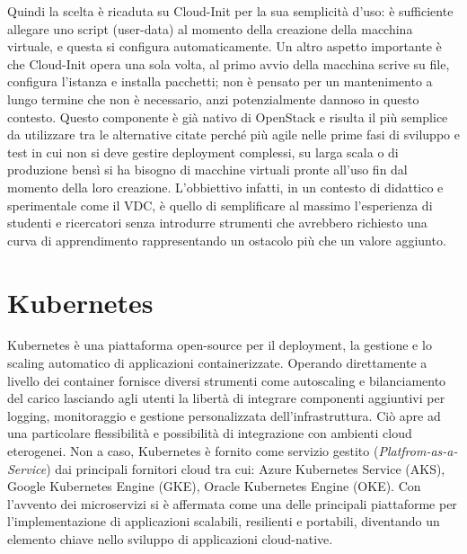 \documentclass[12pt,a4paper,openright,twoside]{book}
\begin{document}
Quindi la scelta è ricaduta su Cloud-Init per la sua semplicità d'uso: è sufficiente allegare uno script (user-data) al momento della creazione della macchina virtuale, e questa si configura automaticamente.
Un altro aspetto importante è che Cloud-Init opera una sola volta, al primo avvio della macchina scrive su file, configura l'istanza e installa pacchetti; non è pensato per un mantenimento a lungo termine che non è necessario,
anzi potenzialmente dannoso in questo contesto. 
Questo componente è già nativo di OpenStack e risulta il più semplice da utilizzare tra le alternative citate perché più agile nelle prime fasi di sviluppo e test in cui non si deve gestire deployment complessi, su larga scala o
di produzione bensì si ha bisogno di macchine virtuali pronte all'uso fin dal momento della loro creazione.
L'obbiettivo infatti, in un contesto di didattico e sperimentale come il VDC, è quello di semplificare al massimo l'esperienza di studenti e ricercatori senza introdurre strumenti che avrebbero richiesto una curva di apprendimento
rappresentando un ostacolo più che un valore aggiunto.

%
\section{Kubernetes}
\label{sec:kube}
%
%
Kubernetes è una piattaforma open-source per il deployment, la gestione e lo scaling automatico di applicazioni containerizzate. 
Operando direttamente a livello dei container fornisce diversi strumenti come autoscaling e bilanciamento del carico lasciando agli utenti la libertà di integrare componenti aggiuntivi per logging, monitoraggio e gestione personalizzata dell'infrastruttura.
Ciò apre ad una particolare flessibilità e possibilità di integrazione con ambienti cloud eterogenei. Non a caso, Kubernetes è fornito come servizio gestito (\textit{Platfrom-as-a-Service}) dai principali fornitori cloud tra cui: Azure Kubernetes Service (AKS), Google Kubernetes Engine (GKE), Oracle Kubernetes Engine (OKE).
Con l'avvento dei microservizi si è affermata come una delle principali piattaforme per l'implementazione di applicazioni scalabili, resilienti e portabili, diventando un elemento chiave nello sviluppo di applicazioni cloud-native.
\end{document}
